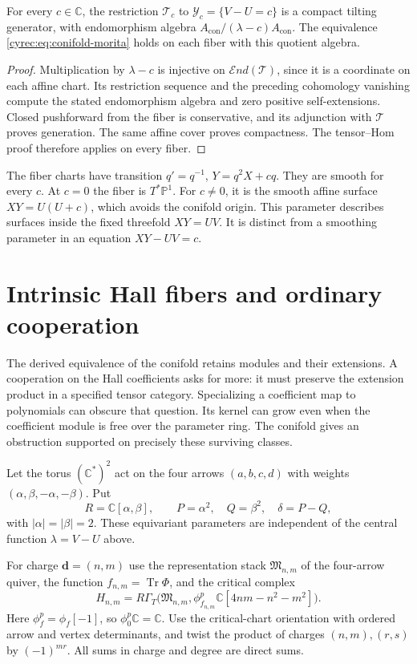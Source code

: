 \begin{corollary}\label{cyrec:cor:conifold-fibres}
For every $c\in\mathbb C$, the restriction $\mathcal T_c$ to
$\mathcal Y_c=\{V-U=c\}$ is a compact tilting generator, with
endomorphism algebra $A_{\mathrm{con}}/(\lambda-c)A_{\mathrm{con}}$.
The equivalence \eqref{cyrec:eq:conifold-morita} holds on each
fiber with this quotient algebra.
\end{corollary}

\begin{proof}
Multiplication by $\lambda-c$ is injective on
$\mathcal E nd(\mathcal T)$, since it is a coordinate on each
affine chart. Its restriction sequence and the preceding
cohomology vanishing compute the stated endomorphism algebra
and zero positive self-extensions. Closed pushforward from the
fiber is conservative, and its adjunction with $\mathcal T$
proves generation. The same affine cover proves compactness.
The tensor--Hom proof therefore applies on every fiber.
\end{proof}

The fiber charts have transition
$q'=q^{-1}$, $Y=q^2X+cq$. They are smooth for every $c$.
At $c=0$ the fiber is $T^*\mathbb P^1$.
For $c\ne0$, it is the smooth affine surface
$XY=U(U+c)$, which avoids the conifold origin.
This parameter describes surfaces inside the fixed threefold
$XY=UV$. It is distinct from a smoothing parameter in an
equation $XY-UV=c$.

\section{Intrinsic Hall fibers and ordinary cooperation}

The derived equivalence of the conifold retains modules and their
extensions. A cooperation on the Hall coefficients asks for more:
it must preserve the extension product in a specified tensor
category. Specializing a coefficient map to polynomials can obscure
that question. Its kernel can grow even when the coefficient module
is free over the parameter ring. The conifold gives an obstruction
supported on precisely these surviving classes.

Let the torus $(\mathbb C^*)^2$ act on the four arrows
$(a,b,c,d)$ with weights $(\alpha,\beta,-\alpha,-\beta)$.
Put
\[
 R=\mathbb C[\alpha,\beta],\qquad
 P=\alpha^2,\quad Q=\beta^2,\quad\delta=P-Q,
\]
with $|\alpha|=|\beta|=2$. These equivariant parameters are
independent of the central function $\lambda=V-U$ above.

For charge $\mathbf d=(n,m)$ use the representation stack
$\mathfrak M_{n,m}$ of the four-arrow quiver, the function
$f_{n,m}=\operatorname{Tr}\Phi$, and the critical complex
\begin{equation}\label{cyrec:eq:critical-carrier}
 H_{n,m}=R\Gamma_T\bigl(\mathfrak M_{n,m},
                  \phi^p_{f_{n,m}}\mathbb C[4nm-n^2-m^2]\bigr).
\end{equation}
Here $\phi^p_f=\phi_f[-1]$, so $\phi^p_0\mathbb C=\mathbb C$.
Use the critical-chart orientation with ordered arrow and vertex
determinants, and twist the product of charges $(n,m),(r,s)$
by $(-1)^{mr}$. All sums in charge and degree are direct sums.

